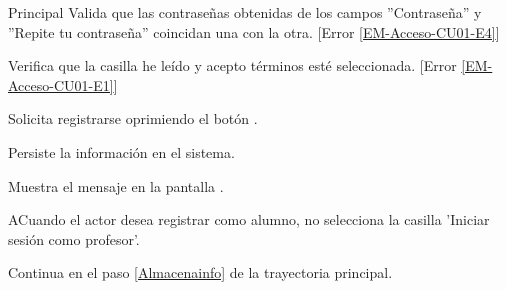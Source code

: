 \begin{UCtrayectoria}{Principal}
	    \UCpaso Valida que las contraseñas obtenidas de los campos ''Contraseña'' y ''Repite tu contraseña'' coincidan una con la otra. [Error  \ref{EM-Acceso-CU01-E4}]

	    \UCpaso Verifica que la casilla he leído y acepto términos esté seleccionada. [Error \ref{EM-Acceso-CU01-E1}]

	    \UCpaso [\UCactor] Solicita registrarse oprimiendo el botón .

	    \UCpaso Persiste la información en el sistema.

		\UCpaso Muestra el mensaje  en la pantalla .

\end{UCtrayectoria}

\begin{UCtrayectoriaA}{A}{Cuando el actor desea registrar como alumno, no selecciona la casilla 'Iniciar sesión como profesor'.}

	\UCpaso Continua en el paso \ref{Almacenainfo} de la trayectoria principal.

\end{UCtrayectoriaA}
